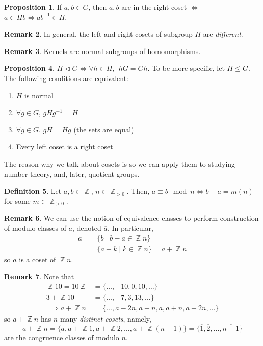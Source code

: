 \documentclass[11pt]{amsart} %
\theoremstyle{definition}
\newtheorem{definition}{Definition}[section]
\newtheorem{proposition}[definition]{Proposition}
\theoremstyle{definition}
\newtheorem{remark}[definition]{Remark}
\DeclareMathOperator{\Z}{\mathbb{Z}}
\numberwithin{equation}{section}
\begin{document}
\begin{proposition}
	If $a,b\in G$, then $a,b $ are in the right coset $\iff$ $a \in Hb \iff ab^{-1} \in H$.
\end{proposition}

\begin{remark}
	In general, the left and right cosets of subgroup $H$ are \textit{different}.
\end{remark}

\begin{remark}
	Kernels are normal subgroups of homomorphisms.
\end{remark}

\begin{proposition}
	$H \lhd G \iff \forall  h \in H, \: \: hG = Gh$. To be more specific, let $H \leq G$. The following conditions are equivalent:
	\begin{enumerate}%
		\item $H$ is normal
		\item $\forall g \in G$, $g H g^{-1} = H$
		\item $\forall g \in G$, $gH = Hg$ (the sets are equal)
		\item Every left coset is a right coset
	\end{enumerate}
\end{proposition}

The reason why we talk about cosets is so we can apply them to studying number theory, and, later, quotient groups.

\begin{definition}
	Let $a,b \in \Z$, $n \in \Z_{>0}$. Then, $a \equiv b \mod n \iff b - a = m(n)$ for some $m \in \Z_{>0}$.
\end{definition}

\begin{remark}
	We can use the notion of equivalence classes to perform construction of modulo classes of $a$, denoted $\overline{a}$. In particular,
	$$\begin{aligned}
	\overline{a} &= \{ b \mid b-a \in \Z n \} \\
	&= \{ a + k \mid k \in \Z n \} = a+ \Z n
	\end{aligned}$$
	so $\overline{a}$ is a coset of $\Z n$.
\end{remark}

\begin{remark}
	Note that
	$$\begin{aligned}
	\Z 10 = 10 \Z &= \{\dots, -10,0,10, \dots \} \\
	3 + \Z 10 &= \{ \dots, -7, 3, 13, \dots \} \\
	\implies a + \Z n &= \{  \dots, a-2n, a - n, a , a+ n, a+ 2n , \dots  \}
	\end{aligned}$$
	so $a + \Z n$ has $n$ many \textit{distinct cosets}, namely,
	$$ a + \Z n = \{ a, a + \Z 1,  a + \Z 2, \dots, a + \Z (n-1)  \} = \{ \overline{1}, \overline{2}, \dots, \overline{n-1} \}$$
	are the congruence classes of modulo $n$.
\end{remark}
\end{document}
